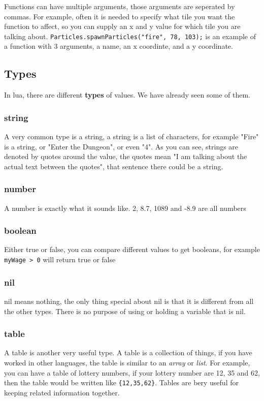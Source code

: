 \documentclass{book}
\begin{document}
Functions can have multiple arguments, those arguments are seperated by commas. For example, often it is needed to specify what tile you want the function to affect, so you can supply an x and y value for which tile you are talking about. \texttt{Particles.spawnParticles("fire", 78, 103);} is an example of a function with 3 arguments, a name, an x coordinte, and a y coordinate.

\subsection{Types}

In lua, there are different \textbf{types} of values. We have already seen some of them.

\subsubsection{string}
A very common type is a string, a string is a list of characters, for example "Fire" is a string, or "Enter the Dungeon", or even "4". As you can see, strings are denoted by quotes around the value, the quotes mean "I am talking about the actual text between the quotes", that sentence there could be a string.

\subsubsection{number}
A number is exactly what it sounds like. 2, 8.7, 1089 and -8.9 are all numbers

\subsubsection{boolean}
Either true or false, you can compare different values to get booleans, for example \texttt{myWage > 0} will return true or false

\subsubsection{nil}
nil means nothing, the only thing special about nil is that it is different from all the other types. There is no purpose of using or holding a variable that is nil.

\subsubsection{table}
A table is another very useful type. A table is a collection of things, if you have worked in other languages, the table is similar to an \textit{array} or \textit{list}. For example, you can have a table of lottery numbers, if your lottery number are 12, 35 and 62, then the table would be written like \texttt{\{12,35,62\}}. Tables are bery useful for keeping related information together.
\end{document}
